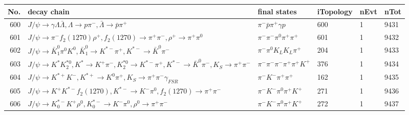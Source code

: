 \begin{table}[htbp] 
\begin{center}
\begin{small}
\begin{tabular}{rlllll}\hline\hline
 No. & decay chain & final states &  iTopology & nEvt & nTot \\\hline
600&$J/\psi       \rightarrow \gamma       \Lambda           \bar{\Lambda}    , \Lambda            \rightarrow p                 \pi^{-}        , \bar{\Lambda}     \rightarrow \bar{p}          \pi^{+}        $&$\pi^{-}        \bar{p}          \pi^{+}        \gamma       p                 $&  600&    1& 9431\\
601&$J/\psi       \rightarrow \pi^{-}        f_{2}(1270)    \rho^{+}      , f_{2}(1270)     \rightarrow \pi^{+}        \pi^{-}        , \rho^{+}       \rightarrow \pi^{+}        \pi^{0}        $&$\pi^{-}        \pi^{-}        \pi^{0}        \pi^{+}        \pi^{+}        $&  601&    1& 9432\\
602&$J/\psi       \rightarrow \bar{K}_1^{0} \pi^{0}        K^{0}          , \bar{K}_1^{0}  \rightarrow K^{*-}         \pi^{+}        , K^{*-}          \rightarrow \bar{K}^{0}   \pi^{-}        $&$\pi^{-}        \pi^{0}        K_{L}          K_{L}          \pi^{+}        $&  204&    1& 9433\\
603&$J/\psi       \rightarrow K^{*}          K_2^{*0}       , K^{*}           \rightarrow K^{+}          \pi^{-}        , K_2^{*0}        \rightarrow K^{*-}         \pi^{+}        , K^{*-}          \rightarrow \bar{K}^{0}   \pi^{-}        , K_{S}           \rightarrow \pi^{+}        \pi^{-}        $&$\pi^{-}        \pi^{-}        \pi^{-}        \pi^{+}        \pi^{+}        K^{+}          $&  376&    1& 9434\\
604&$J/\psi       \rightarrow K^{*+}         K^{-}          , K^{*+}          \rightarrow K^{0}          \pi^{+}        , K_{S}           \rightarrow \pi^{+}        \pi^{-}        \gamma_{FSR} $&$\pi^{-}        K^{-}          \pi^{+}        \pi^{+}        $&  162&    1& 9435\\
605&$J/\psi       \rightarrow K^{+}          K^{*-}         f_{2}(1270)    , K^{*-}          \rightarrow K^{-}          \pi^{0}        , f_{2}(1270)     \rightarrow \pi^{+}        \pi^{-}        $&$\pi^{-}        K^{-}          \pi^{0}        \pi^{+}        K^{+}          $&  271&    1& 9436\\
606&$J/\psi       \rightarrow K_{0}^{*-}     K^{+}          \rho^{0}      , K_{0}^{*-}      \rightarrow K^{-}          \pi^{0}        , \rho^{0}       \rightarrow \pi^{+}        \pi^{-}        $&$\pi^{-}        K^{-}          \pi^{0}        \pi^{+}        K^{+}          $&  272&    1& 9437\\

\end{tabular}
\end{small}
\end{center}
\end{table}
